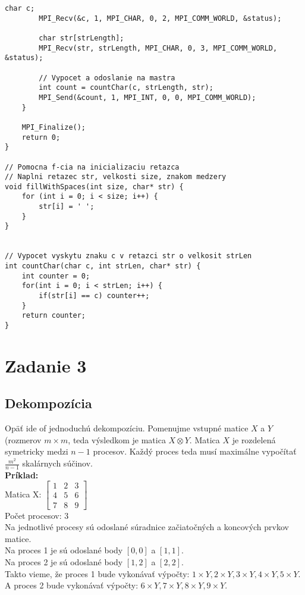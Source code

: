 \documentclass{report}
\begin{document}
\begin{lstlisting}[tabsize=4]
		char c;
		MPI_Recv(&c, 1, MPI_CHAR, 0, 2, MPI_COMM_WORLD, &status);

		char str[strLength];
		MPI_Recv(str, strLength, MPI_CHAR, 0, 3, MPI_COMM_WORLD, &status);

		// Vypocet a odoslanie na mastra
		int count = countChar(c, strLength, str);	
		MPI_Send(&count, 1, MPI_INT, 0, 0, MPI_COMM_WORLD);
	}

	MPI_Finalize();
	return 0;
}

// Pomocna f-cia na inicializaciu retazca
// Naplni retazec str, velkosti size, znakom medzery
void fillWithSpaces(int size, char* str) {
	for (int i = 0; i < size; i++) {
		str[i] = ' ';
	}
}


// Vypocet vyskytu znaku c v retazci str o velkosit strLen
int countChar(char c, int strLen, char* str) {
	int counter = 0;
	for(int i = 0; i < strLen; i++) {
		if(str[i] == c) counter++;
	}
	return counter;
}
\end{lstlisting}

\chapter{Zadanie 3}
\section{Dekompozícia}
Opäť ide of jednoduchú dekompozíciu.
Pomenujme vstupné matice \(X\) a \(Y\) (rozmerov \(m \times m\), teda výsledkom je matica \(X \otimes Y\).
Matica \(X\) je rozdelená symetricky medzi \(n - 1\) procesov.
Každý proces teda musí maximálne vypočítať \(\frac{m^2}{n - 1}\) skalárnych súčinov. \\

\textbf{Príklad:} \\
Matica X: 
\(
\begin{bmatrix}
	1 & 2 & 3 \\
	4 & 5 & 6 \\
	7 & 8 & 9
\end{bmatrix}
\) \\
Počet procesov: 3 \\
Na jednotlivé procesy sú odoslané súradnice začiatočných a koncových prvkov matice.\\
Na proces 1 je sú odoslané body \([0,0]\) a \([1, 1]\). \\
Na proces 2 je sú odoslané body \([1,2]\) a \([2, 2]\). \\
Takto vieme, že proces 1 bude vykonávať výpočty: \(1 \times Y, 2 \times Y, 3 \times Y, 4 \times Y, 5 \times Y\). \\
A proces 2 bude vykonávať výpočty: \(6 \times Y, 7 \times Y, 8 \times Y, 9 \times Y\). \\
\end{document}
